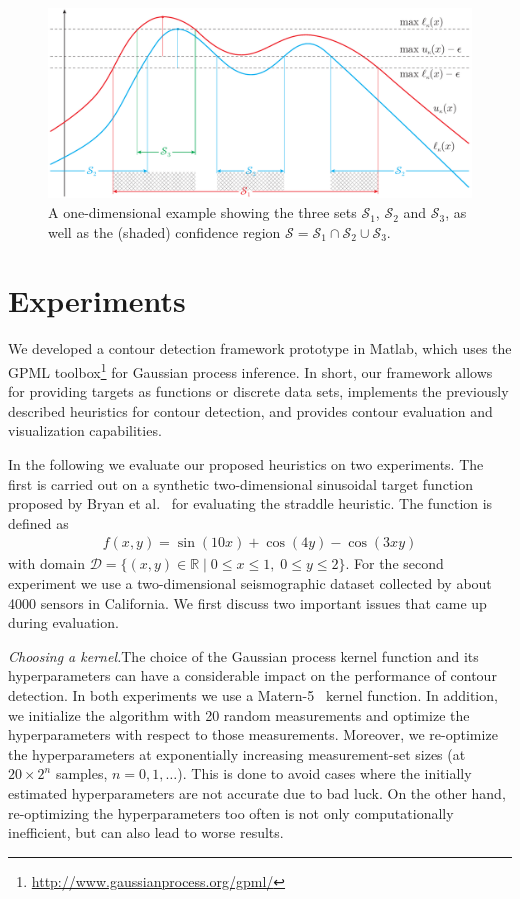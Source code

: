 \documentclass[11pt]{article} %
\begin{document}
\begin{figure}[tb]
  \centering
  \includegraphics[width=\textwidth]{figures/cb_eps}
  \caption{A one-dimensional example showing the three sets $\mathcal{S}_1$,
           $\mathcal{S}_2$ and $\mathcal{S}_3$, as well as
           the (shaded) confidence region
           $\mathcal{S} = \mathcal{S}_1\cap\mathcal{S}_2\cup\mathcal{S}_3$.}
  \label{fig:cbe}
\end{figure}

\section{Experiments}
We developed a contour detection framework prototype in Matlab, which uses the
GPML toolbox\footnote{\url{http://www.gaussianprocess.org/gpml/}} for
Gaussian process inference. In short, our framework allows for providing
targets as functions or discrete data sets,
implements the previously described heuristics for contour detection, and
provides contour evaluation and visualization capabilities.

In the following we evaluate our proposed heuristics on two experiments.
The first is carried out on a synthetic two-dimensional sinusoidal target
function proposed by Bryan et al.~\cite{bryan2005} for evaluating the straddle
heuristic. The function is defined as
\begin{align*}
  f(x, y) = \sin(10x) + \cos(4y) - \cos(3xy)
\end{align*}
with domain
$\mathcal{D} = \{(x, y) \in \mathbb{R} \mid 0 \leq x \leq 1,\;0 \leq y \leq 2\}$.
For the second experiment we use a two-dimensional seismographic dataset
collected by about 4000 sensors in California.
We first discuss two important issues that came up during evaluation.

\noindent\emph{Choosing a kernel.}\;The choice of the Gaussian process
kernel function and its hyperparameters can have a considerable impact on the
performance of contour detection. In both experiments we use a
Matern-5~\cite{gpbook} kernel function. In addition, we initialize the algorithm
with 20 random measurements and optimize the hyperparameters with respect to
those measurements. Moreover, we re-optimize the hyperparameters at
exponentially increasing measurement-set sizes
(at $20\times 2^n$ samples, $n = 0, 1,\ldots$). This is done to avoid cases
where the initially estimated hyperparameters are not accurate due to bad luck.
On the other hand, re-optimizing the hyperparameters too often is not only
computationally inefficient, but can also lead to worse results.
\end{document}
